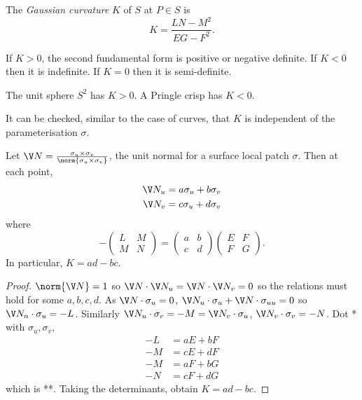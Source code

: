 \documentclass[a4paper]{article}
\theoremstyle{definition}
\begin{document}
\begin{definition}
  The \emph{Gaussian curvature} \(K\) of \(S\) at \(P \in S\) is
  \[
    K = \frac{LN - M^2}{EG - F^2}.
  \]
\end{definition}

If \(K > 0\), the second fundamental form is positive or negative definite. If \(K < 0\) then it is indefinite. If \(K = 0\) then it is semi-definite.

\begin{eg}[Informal]
  The unit sphere \(S^2\) has \(K > 0\). A Pringle crisp has \(K < 0\).
\end{eg}

\begin{remark}
  It can be checked, similar to the case of curves, that \(K\) is independent of the parameterisation \(\sigma\).
\end{remark}

\begin{proposition}
  Let \(\V N = \frac{\sigma_u \times \sigma_v}{\norm{\sigma_u \times \sigma_v}}\), the unit normal for a surface local patch \(\sigma\). Then at each point,
  \begin{align*}
    \V N_u &= a \sigma_u + b \sigma_v \\
    \V N_v &= c \sigma_u + d \sigma_v
  \end{align*}
  where
  \[
    -
    \begin{pmatrix}
      L & M \\
      M & N
    \end{pmatrix}
    =
    \begin{pmatrix}
      a & b \\
      c & d
    \end{pmatrix}
    \begin{pmatrix}
      E & F \\
      F & G
    \end{pmatrix}.
  \]
  In particular, \(K = ad - bc\).
\end{proposition}

\begin{proof}
  \(\norm{\V N} = 1\) so \(\V N \cdot \V N_u = \V N \cdot \V N_v = 0\) so the relations must hold for some \(a, b, c, d\). As \(\V N \cdot \sigma_u = 0\), \(\V N_u \cdot \sigma_u + \V N \cdot \sigma_{uu} = 0\) so \(\V N_n \cdot \sigma_u = -L\). Similarly \(\V N_u \cdot \sigma_v = -M = \V N_v \cdot \sigma_u\), \(\V N_v \cdot \sigma_v = -N\). Dot * with \(\sigma_u, \sigma_v\),
  \begin{align*}
    -L &= aE + bF \\
    -M &= cE + dF \\
    -M &= aF + bG \\
    -N &= cF + dG
  \end{align*}
  which is **. Taking the determinants, obtain \(K = ad - bc\).
\end{proof}
\end{document}
